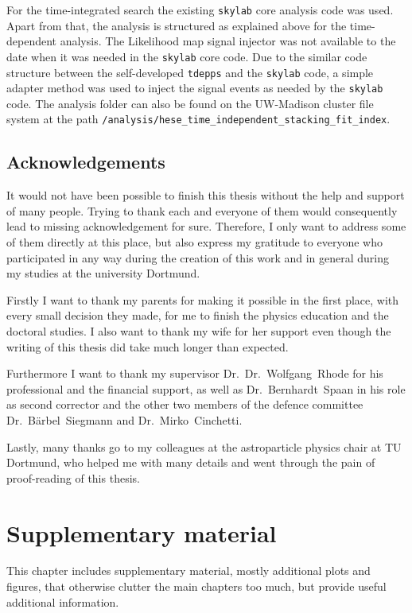 For the time-integrated search the existing \lstinline!skylab! core analysis code was used.
Apart from that, the analysis is structured as explained above for the time-dependent analysis.
The Likelihood map signal injector was not available to the date when it was needed in the \lstinline!skylab! core code.
Due to the similar code structure between the self-developed \lstinline!tdepps! and the \lstinline!skylab! code, a simple adapter method was used to inject the signal events as needed by the \lstinline!skylab! code.
The analysis folder can also be found on the UW-Madison cluster file system at the path \lstinline!/analysis/hese_time_independent_stacking_fit_index!.

\newpage
\section{Acknowledgements}
It would not have been possible to finish this thesis without the help and support of many people.
Trying to thank each and everyone of them would consequently lead to missing acknowledgement for sure.
Therefore, I only want to address some of them directly at this place, but also express my gratitude to everyone who participated in any way during the creation of this work and in general during my studies at the university Dortmund.

Firstly I want to thank my parents for making it possible in the first place, with every small decision they made, for me to finish the physics education and the doctoral studies.
I also want to thank my wife for her support even though the writing of this thesis did take much longer than expected.

Furthermore I want to thank my supervisor Dr.~Dr.~Wolfgang~Rhode for his professional and the financial support, as well as Dr.~Bernhardt~Spaan in his role as second corrector and the other two members of the defence committee Dr.~Bärbel~Siegmann and Dr.~Mirko~Cinchetti.

Lastly, many thanks go to my colleagues at the astroparticle physics chair at TU Dortmund, who helped me with many details and went through the pain of proof-reading of this thesis.

\chapter{Supplementary material}
This chapter includes supplementary material, mostly additional plots and figures, that otherwise clutter the main chapters too much, but provide useful additional information.


